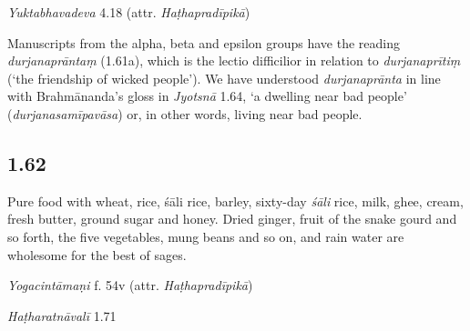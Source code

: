 \begin{ekdosis}
\begin{testimonia}[hp01_061]
\emph{Yuktabhavadeva} 4.18 (attr. \emph{Haṭhapradīpikā})
\begin{versinnote}
\end{versinnote}

\end{testimonia}

\begin{philcomm}[hp01_061]
Manuscripts from the alpha, beta and epsilon groups have the reading \emph{durjanaprāntaṃ} (1.61a), which is the lectio difficilior in relation to \emph{durjanaprītiṃ} (`the friendship of wicked people'). We have understood \emph{durjanaprānta} in line with Brahmānanda's gloss in \emph{Jyotsnā} 1.64, `a dwelling near bad people' (\emph{durjanasamīpavāsa}) or, in other words, living near bad people.  
\end{philcomm}

\subsection*{1.62}
\begin{translation}[hp01_062]
Pure food with wheat, rice, śāli rice, barley, sixty-day \emph{śāli} rice, milk, ghee, cream, fresh butter, ground sugar and honey. Dried ginger, fruit of the snake gourd and so forth, the five vegetables, mung beans and so on, and rain water are wholesome for the best of sages.
\end{translation}


\begin{testimonia}[hp01_062]
\emph{Yogacintāmaṇi} f. 54v (attr. \emph{Haṭhapradīpikā})

\begin{versinnote}
\end{versinnote}

\emph{Haṭharatnāvalī} 1.71


\end{testimonia}
\end{ekdosis}
